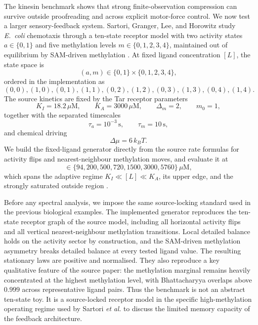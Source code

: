 \documentclass[11pt,a4paper]{article}
\numberwithin{equation}{section}
\theoremstyle{thmcompact}
\theoremstyle{remark}
\begin{document}
The kinesin benchmark shows that strong finite-observation compression can survive outside proofreading and across explicit motor-force control. We now test a larger sensory-feedback system. Sartori, Granger, Lee, and Horowitz study \emph{E.~coli} chemotaxis through a ten-state receptor model with two activity states \(a\in\{0,1\}\) and five methylation levels \(m\in\{0,1,2,3,4\}\), maintained out of equilibrium by SAM-driven methylation \cite{SartoriGrangerLeeHorowitz2014}. At fixed ligand concentration \([L]\), the state space is
\begin{equation}
(a,m)\in\{0,1\}\times\{0,1,2,3,4\},
\end{equation}
ordered in the implementation as
\begin{equation}
(0,0),(1,0),(0,1),(1,1),(0,2),(1,2),(0,3),(1,3),(0,4),(1,4).
\end{equation}
The source kinetics are fixed by the Tar receptor parameters
\begin{equation}
K_I=18.2\,\mu\mathrm{M},\qquad K_A=3000\,\mu\mathrm{M},\qquad
\Delta_m=2,\qquad m_0=1,
\end{equation}
together with the separated timescales
\begin{equation}
\tau_a=10^{-3}\,\mathrm{s},\qquad \tau_m=10\,\mathrm{s},
\end{equation}
and chemical driving
\begin{equation}
\Delta\mu=6\,k_B T.
\end{equation}
We build the fixed-ligand generator directly from the source rate formulas for activity flips and nearest-neighbour methylation moves, and evaluate it at
\begin{equation}
[L]\in\{94,200,500,720,1500,3000,5760\}\,\mu\mathrm{M},
\end{equation}
which spans the adaptive regime \(K_I\ll [L]\ll K_A\), its upper edge, and the strongly saturated outside region \cite{SartoriGrangerLeeHorowitz2014}.

Before any spectral analysis, we impose the same source-locking standard used in the previous biological examples. The implemented generator reproduces the ten-state receptor graph of the source model, including all horizontal activity flips and all vertical nearest-neighbour methylation transitions. Local detailed balance holds on the activity sector by construction, and the SAM-driven methylation asymmetry breaks detailed balance at every tested ligand value. The resulting stationary laws are positive and normalised. They also reproduce a key qualitative feature of the source paper: the methylation marginal remains heavily concentrated at the highest methylation level, with Bhattacharyya overlaps above \(0.999\) across representative ligand pairs. Thus the benchmark is not an abstract ten-state toy. It is a source-locked receptor model in the specific high-methylation operating regime used by Sartori \emph{et al.} to discuss the limited memory capacity of the feedback architecture.
\end{document}
